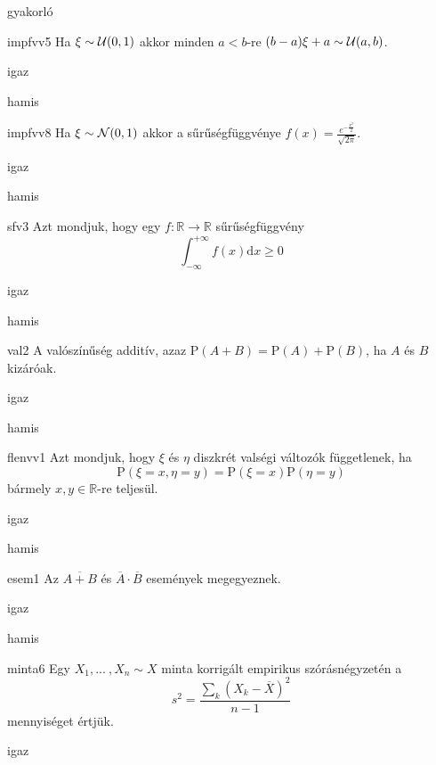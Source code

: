 \documentclass[12pt]{article}
\begin{document}
\begin{quiz}{gyakorló}

\begin{multi}[feedback={Egyenletes lineáris transzformáltja is egyenletes (a konstans elfajult esettől eltekintve)}]{impfvv5}
Ha $\xi\sim {\cal U}(0,1)$ akkor minden $a<b$-re $(b-a)\xi+a\sim {\cal U}(a,b)$.
\item* igaz
\item hamis
\end{multi}
\begin{multi}[feedback={Def.}]{impfvv8}
Ha $\xi\sim {\cal N}(0,1)$ akkor a sűrűségfüggvénye $f(x)=\frac{e^{-\frac{x^2}{2}}}{\sqrt{2\pi}}$.
\item* igaz
\item hamis
\end{multi}
\begin{multi}[feedback={$f\ge 0$ fontos (monoton nemcsökkenő $F$-nek a deriváltja)}]{sfv3}
Azt mondjuk, hogy egy $f:\mathbb{R}\to \mathbb{R}$ sűrűségfüggvény 
$$
\int_{-\infty}^{+\infty}f(x)\mathrm{d } x\ge 0
$$
\item igaz
\item* hamis
\end{multi}
\begin{multi}[feedback={Def.}]{val2}
A valószínűség additív, azaz $\mathrm{P}(A+B)=\mathrm{P}(A)+\mathrm{P}(B)$, ha $A$ és $B$ kizáróak.
\item* igaz
\item hamis
\end{multi}
\begin{multi}[feedback={Def.}]{flenvv1}
Azt mondjuk, hogy $\xi$ és $\eta$ diszkrét valségi változók függetlenek, ha
$$
\mathrm{P}(\xi=x,\eta=y)=\mathrm{P}(\xi=x)\mathrm{P}(\eta=y)
$$
bármely $x,y\in \mathbb{R}$-re teljesül.
\item* igaz
\item hamis
\end{multi}
\begin{multi}[feedback={de-Morgan azonosság}]{esem1}
Az $\overline{A+B}$ és $\overline{A} \cdot \overline{B}$ események megegyeznek.
\item* igaz
\item hamis
\end{multi}
\begin{multi}[feedback={Definíció.}]{minta6}
Egy $X_1,{...\:},X_n\sim X$ minta korrigált empirikus szórásnégyzetén a 
$$
s^2=\frac{\sum_{k} (X_k-\overline{X})^2}{n-1}
$$
mennyiséget értjük.
\item* igaz

\end{multi}
\end{quiz}
\end{document}
